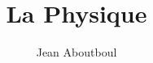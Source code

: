 \documentclass[a4paper, twoside]{report}
\title{La Physique}
\author{Jean Aboutboul}
\begin{document}

\newpage
\renewcommand{\headrulewidth}{0pt}
\strut
\newpage
\tableofcontents











%
%
\end{document}
